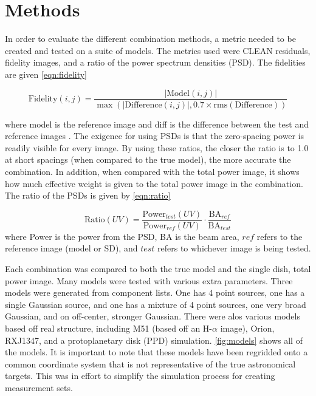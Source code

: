 \documentclass[manuscript,linenumbers]{aastex62}
\begin{document}
\section{Methods}

In order to evaluate the different combination methods, a metric needed to be created and tested on a suite of models. The metrics used were CLEAN residuals, fidelity images, and a ratio of the power spectrum densities (PSD). The fidelities are given \autoref{eqn:fidelity} 
 
\begin{equation}
    \text{Fidelity}(i, j) = \frac{|\text{Model}(i, j)|}{\max{\left(|\text{Difference}(i, j)|, 0.7\times\text{rms}(\text{Difference})\right)}}
    \label{eqn:fidelity}
\end{equation} 

where model is the reference image and diff is the difference between the test and reference images \citep[p.19]{almamemo}. The exigence for using PSDs is that the zero-spacing power is readily visible for every image. By using these ratios, the closer the ratio is to 1.0 at short spacings (when compared to the true model), the more accurate the combination. In addition, when compared with the total power image, it shows how much effective weight is given to the total power image in the combination. The ratio of the PSDs is given by \autoref{eqn:ratio}

\begin{equation}
    \text{Ratio}(UV) = \frac{\text{Power}_{test}(UV)}{\text{Power}_{ref}(UV)} \cdot \frac{\text{BA}_{ref}}{\text{BA}_{test}}
    \label{eqn:ratio}
\end{equation} 
where Power is the power from the PSD, BA is the beam area, $ref$ refers to the reference image (model or SD), and $test$ refers to whichever image is being tested.

Each combination was compared to both the true model and the single dish, total power image. Many models were tested with various extra parameters. Three models were generated from component lists. One has 4 point sources, one has a single Gaussian source, and one has a mixture of 4 point sources, one very broad Gaussian, and on off-center, stronger Gaussian. There were alos various models based off real structure, including M51 (based off an H-$\alpha$ image), Orion, RXJ1347, and a protoplanetary disk (PPD) simulation. \autoref{fig:models} shows all of the models. It is important to note that these models have been regridded onto a common coordinate system that is not representative of the true astronomical targets. This was in effort to simplify the simulation process for creating measurement sets. 
\end{document}
